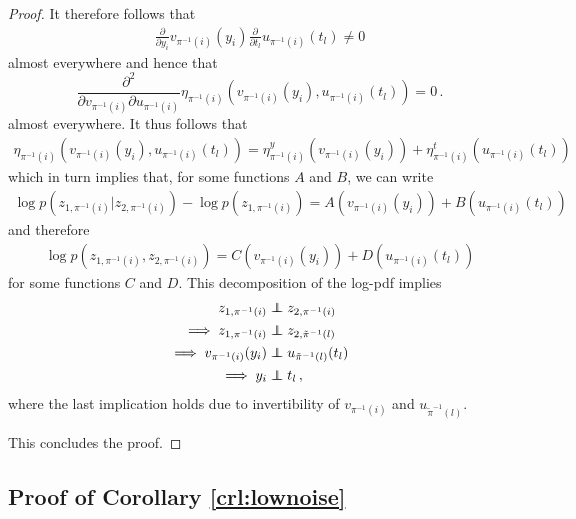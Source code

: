 \begin{proof}
	It therefore follows that
	\begin{align*}
	\frac{\partial}{\partial y_i}v_{\pi^{-1}(i)}(y_i) \frac{\partial }{\partial t_l} u_{\pi^{-1}(i)}(t_l) \neq 0
	\end{align*}
	almost everywhere and hence that
	\begin{equation}
	\frac{\partial^2}{\partial v_{\pi^{-1}(i)} \partial u_{\pi^{-1}(i)}} \eta_{\pi^{-1}(i)}(v_{\pi^{-1}(i)}(y_i), u_{\pi^{-1}(i)}(t_l)) = 0\,. \label{eq:additive_eta}
	\end{equation}
	almost everywhere.
	It thus follows that
	\begin{align*}
	\eta_{\pi^{-1}(i)}(v_{\pi^{-1}(i)}(y_i), u_{\pi^{-1}(i)}(t_l)) = \eta_{\pi^{-1}(i)}^y(v_{\pi^{-1}(i)}(y_i))+ \eta_{\pi^{-1}(i)}^t(u_{\pi^{-1}(i)}(t_l))
	\end{align*}
	which in turn implies that, for some functions $A$ and $B$, we can write
	\begin{align*}
	\log p(z_{1, \pi^{-1}(i)}|z_{2, \pi^{-1}(i)}) - \log p(z_{1, \pi^{-1}(i)}) = A(v_{\pi^{-1}(i)}(y_i)) + B(u_{\pi^{-1}(i)}(t_l))
	\end{align*}
	and therefore
	\begin{align*}
	\log p(z_{1, \pi^{-1}(i)},z_{2, \pi^{-1}(i)}) = C(v_{\pi^{-1}(i)}(y_i)) + D(u_{\pi^{-1}(i)}(t_l))
	\end{align*}
	for some functions $C$ and $D$. This decomposition of the log-pdf implies
	\begin{align*}
	z_{1, \pi^{-1}(i)} &\independent z_{2, \pi^{-1}(i)}\\
	\implies z_{1, \pi^{-1}(i)} &\independent z_{2, \tilde{\pi}^{-1}(l)}  \\
	\implies v_{\pi^{-1}(i)}(y_i)  &\independent u_{\tilde{\pi}^{-1}(l)}(t_l) \\
	\implies y_i  &\independent t_l \,,
	\end{align*}
	where the last implication holds due to invertibility of $v_{\pi^{-1}(i)}$ and $u_{\tilde{\pi}^{-1}(l)}$.
	
	This concludes the proof.
	
\end{proof}

\subsection{Proof of Corollary \ref{crl:lownoise}}
\label{appendix:thm2}


